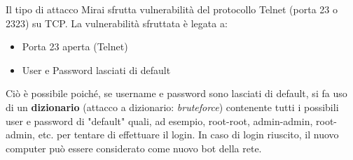 Il tipo di attacco Mirai sfrutta vulnerabilità del protocollo Telnet (porta 23 o 2323) su TCP. La vulnerabilità sfruttata è legata a:
\begin{itemize}
    \item Porta 23 aperta (Telnet)
    \item User e Password lasciati di default 
\end{itemize}
Ciò è possibile poiché, se username e password sono lasciati di default, si fa uso di un \textbf{dizionario} (attacco a dizionario: \textit{bruteforce}) contenente tutti i possibili user e password di "default" quali, ad esempio, root-root, admin-admin, root-admin, etc. per tentare di effettuare il login. In caso di login riuscito, il nuovo computer può essere considerato come nuovo bot della rete. 
